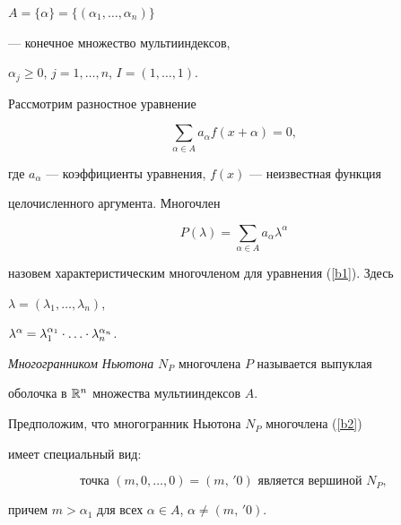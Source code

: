 $A=\{\alpha\}=\{(\alpha_1, \dotsc, \alpha_n)\}$


--- конечное множество мультииндексов,


$\alpha_j\ge0$, $j=1,\dotsc,n$, $I=(1,\dotsc,1)$.





Рассмотрим разностное уравнение


\begin{equation}


\sum_{\alpha\in A}a_\alpha f(x+\alpha)=0,\label{b1}


\end{equation}


где $a_\alpha$ --- коэффициенты уравнения, $f(x)$ --- неизвестная функция


целочисленного аргумента. Многочлен


\begin{equation}


P(\lambda)=\sum_{\alpha\in A}a_\alpha \lambda^\alpha\label{b2}


\end{equation}


назовем характеристическим многочленом для уравнения (\ref{b1}). Здесь


$\lambda=( \lambda_1,\dotsc,\lambda_n)$,


$\lambda^\alpha=\linebreak \lambda_1^{\alpha_1}\cdot


\dotsc\cdot\lambda_n^{\alpha_n}$.





{\it Многогранником Ньютона} $N_P$ многочлена $P$ называется выпуклая 


оболочка в $\Bbb R^n$ множества мультииндексов $A$.





Предположим, что многогранник Ньютона $N_P$ многочлена (\ref{b2})


имеет специальный вид:


\begin{equation}


\label{eq3}


\text{точка } (m,0,\dotsc,0)=(m,\,'0) \text{ является вершиной } N_P,


\end{equation}


причем $m>\alpha_1$ для всех $\alpha\in A$, $\alpha\ne(m,\,'0)$.


